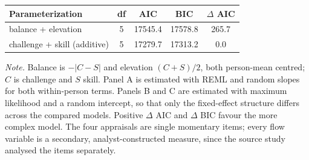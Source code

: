 \begin{table}[!htbp]
\begin{tabular*}{\textwidth}{@{\extracolsep{\fill}}lcccc@{}}
\toprule
Parameterization & df & AIC & BIC & $\Delta$ AIC \\
\midrule
balance + elevation & 5 & 17545.4 & 17578.8 & 265.7 \\
challenge + skill (additive) & 5 & 17279.7 & 17313.2 & 0.0 \\
\bottomrule
\end{tabular*}
\par\vspace{3pt}\noindent\parbox{\textwidth}{\footnotesize\textit{Note.} Balance is $-|C-S|$ and elevation $(C+S)/2$, both person-mean centred; $C$ is challenge and $S$ skill. Panel A is estimated with REML and random slopes for both within-person terms. Panels B and C are estimated with maximum likelihood and a random intercept, so that only the fixed-effect structure differs across the compared models. Positive $\Delta$ AIC and $\Delta$ BIC favour the more complex model. The four appraisals are single momentary items; every flow variable is a secondary, analyst-constructed measure, since the source study analysed the items separately.}
\endgroup
\end{table}
